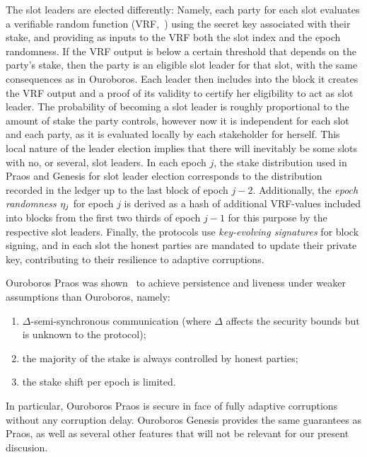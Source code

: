 The slot leaders are elected differently: Namely, each party for each
slot evaluates a verifiable random function (VRF,~\cite{vrf}) using
the secret key associated with their stake, and providing as inputs to the VRF
both the slot index and the epoch randomness. If the VRF output is below a
certain threshold that depends on the party's stake, then the party is an
eligible slot leader  for that slot, with the same consequences as in Ouroboros.
Each leader then includes into the block it creates the VRF output and a
proof of its validity to certify her eligibility to act as slot leader.
%
The probability of becoming a slot leader is roughly proportional to the amount of
stake the party controls, however now it is independent for each slot and each
party, as it is evaluated locally by each stakeholder for herself.  This local
nature of the leader election implies that there will inevitably be some slots
with no, or several, slot leaders.
%
In each epoch $j$, the stake distribution used in Praos and Genesis
for slot leader
election corresponds to the distribution recorded in the ledger up to the last
block of epoch $j-2$.  Additionally, the \emph{epoch randomness $\eta_j$} for epoch $j$
is derived as a hash of additional VRF-values included into blocks
from the first two thirds of epoch $j-1$ for this purpose by the respective slot
leaders.
%
Finally, the protocols use \emph{key-evolving signatures} for
block signing, and in each slot the honest parties are mandated to update their
private key, contributing to their resilience to adaptive corruptions.

Ouroboros Praos was shown~\cite{praos} to achieve
persistence and liveness under weaker assumptions than Ouroboros,
namely:
\begin{enumerate}
  \item
    $\Delta$-semi-synchronous communication
    (where $\Delta$ affects the security bounds
    but is unknown to the protocol);
  \item
    the majority of the stake is always controlled by honest parties;
  \item
    the stake shift per epoch is limited.
\end{enumerate}
In particular, Ouroboros Praos is secure in face of fully adaptive corruptions
without any corruption  delay.
Ouroboros Genesis provides the same guarantees as Praos, as well as several
other features that will not be relevant for our present
discusion.

